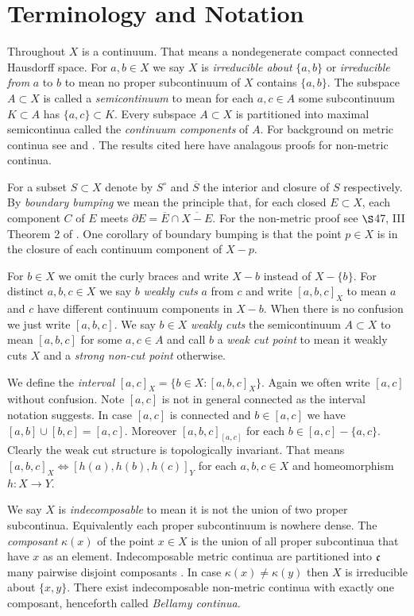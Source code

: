 \documentclass[12pt]{article}
\theoremstyle{plain}
\theoremstyle{definition}
\newcommand{\K}{\ensuremath{\kappa}}
\newcommand{\0}{\ensuremath{\varnothing}}
\newcommand{\DD}{\ensuremath{\partial}}
\newcommand{\cn}{\ensuremath{\frak c}}
\begin{document}
	
	\section{Terminology and Notation}
	\noindent
	Throughout $X$ is a continuum. 
	That means a nondegenerate compact connected Hausdorff space.
	For $a,b \in X$ we say $X$ is \textit{irreducible about} $\{a,b\}$
	or \textit{irreducible from} $a$ to $b$
	to mean no proper subcontinuum of $X$ contains $\{a,b\}$.
	The subspace $A \subset X$ is called a \textit{semicontinuum} to mean
	for each $a,c \in A$ some subcontinuum $K \subset A$ has $\{a,c\} \subset K$.
	Every subspace $A \subset X$ is partitioned into maximal semicontinua called the \textit{continuum components} of $A$.
	For background on metric continua see \cite{kur2} and \cite{nadlerbook}.
	The results cited here have analagous proofs for non-metric continua.
	
	For a subset $S \subset X$ denote by $S^\circ$ and $\overline S$ the interior and closure of $S$ respectively. 
	By \textit{boundary bumping} we mean the principle that, for each closed $E \subset X$, each component $C$ of $E$ meets $\DD E = \overline E \cap \overline {X-E}$.
	For the non-metric proof see $\S$47, III Theorem 2 of \cite{kur2}. 
	One corollary of boundary bumping is that the point $p \in X$ is in the closure of each continuum component of $X-p$.
	
	
	For $b \in X$ we omit the curly braces and write $X-b$ instead of $X-\{b\}$.
	For distinct $a,b,c \in X$ we say $b$ \textit{weakly cuts} $a$ from $c$ and write $[a,b,c]_X$ to mean
	$a$ and $c$  have different continuum components in $X- b$.  When there is no confusion we just write $[a,b,c]$.
	We say $b \in X$ \textit{weakly cuts} the semicontinuum $A \subset X$ to mean $[a,b,c]$ for some $a,c \in A$
	and call $b$ a \textit{weak cut point} to mean it weakly cuts $X$ and a \textit{strong non-cut point} otherwise.
	
	We define the {\it interval} $[a,c]_X = \big \{b \in X: [a,b,c]_X\big\}$. Again we often write $[a,c]$ without confusion.
	Note $[a,c]$ is not in general connected as the interval notation suggests.
	In case $[a,c]$ is connected and $b \in [a,c]$ we have $[a,b] \cup [b,c] = [a,c]$.
	Moreover $[a,b,c]_{[a,c]}$ for each \mbox{$b \in [a,c] - \{a,c\}$}.
	Clearly the weak cut structure is topologically invariant. 
	That means $[a,b,c]_X \iff [h(a),h(b),h(c)]_Y$ for each $a,b,c \in X$ and homeomorphism $h:X \to Y$.
	
	We say $X$ is \textit{indecomposable} to mean it is not the union of two proper subcontinua.
	Equivalently each proper subcontinuum is nowhere dense.
	The \textit{composant} $\K(x)$ of the point $x \in X$ is the union of all proper subcontinua that have $x$ as an element.
	Indecomposable metric continua are partitioned into $\cn$ many pairwise disjoint composants \cite{Ccomposants}.
	In case $\K(x) \ne \K(y)$ then $X$ is irreducible about $\{x,y\}$.
	There exist indecomposable non-metric continua \cite{one,NCF2,Smith1} with exactly one composant, henceforth called \textit{Bellamy continua}.
	
\end{document}
